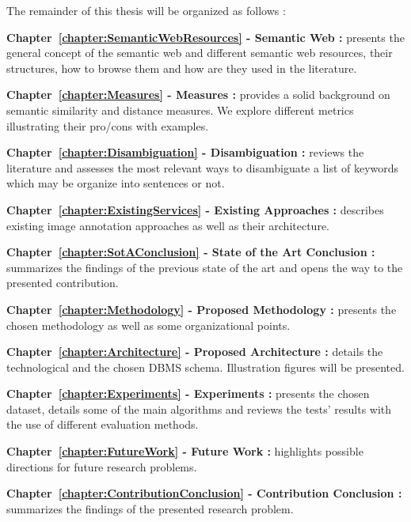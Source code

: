 The remainder of this thesis will be organized as follows :
\begin{description}
\item\textbf{Chapter~\ref{chapter:SemanticWebResources} - Semantic Web :} presents the general concept of the semantic web and different semantic web resources, their structures, how to browse them and how are they used in the literature. 
\item\textbf{Chapter~\ref{chapter:Measures} - Measures :} provides a solid background on semantic similarity and distance measures. We explore different metrics illustrating their pro/cons with examples.
\item\textbf{Chapter~\ref{chapter:Disambiguation} - Disambiguation :} reviews the literature and assesses the most relevant ways to disambiguate a list of keywords which may be organize into sentences or not. 
\item\textbf{Chapter~\ref{chapter:ExistingServices} - Existing Approaches :} describes existing image annotation approaches as well as their architecture.
\item\textbf{Chapter~\ref{chapter:SotAConclusion} - State of the Art Conclusion :} summarizes the findings of the previous state of the art and opens the way to the presented contribution.
\item\textbf{Chapter~\ref{chapter:Methodology} - Proposed Methodology :} presents the chosen methodology as well as some organizational points.
\item\textbf{Chapter~\ref{chapter:Architecture} - Proposed Architecture :} details the technological and the chosen DBMS schema. Illustration figures will be presented.
\item\textbf{Chapter~\ref{chapter:Experiments} - Experiments :} presents the chosen dataset, details some of the main algorithms and reviews the tests' results with the use of different evaluation methods.
\item\textbf{Chapter~\ref{chapter:FutureWork} - Future Work :} highlights possible directions for future research problems.
\item\textbf{Chapter~\ref{chapter:ContributionConclusion} - Contribution Conclusion :} summarizes the findings of the presented research problem.
\end{description}

